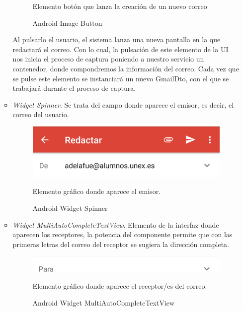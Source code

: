 \documentclass[12pt,a4paper,oneside]{book} %
\begin{document}
\begin{itemize}
\begin{itemize}
\begin{figure}[htb]
\begin{center}
	    	\caption{Android Image Button}{Elemento botón que lanza la creación de un nuevo correo}
    		\label{fig:Android Image Button}
		\end{center}
	\end{figure}
\newline
Al pulsarlo el usuario, el sistema lanza una nueva pantalla en la que redactará el correo. Con lo cual, la pulsación de este elemento de la UI nos inicia el proceso de captura poniendo a nuestro servicio un contenedor, donde compondremos la información del correo. 
\newline
\newline
Cada vez que se pulse este elemento se instanciará un nuevo GmailDto, con el que se trabajará durante el proceso de captura. 

\item \textit{Widget Spinner}. Se trata del campo donde aparece el emisor, es decir, el correo del usuario. 
 	\begin{figure}[H]
		\begin{center}
     		\includegraphics[scale=0.2]{pictures/IRL/GMail/nuevo_correo_gmail_emisor.png}
	    	\caption{Android Widget Spinner}{Elemento gráfico donde aparece el emisor.}
    		\label{fig:Android Widget Spinner}
		\end{center}
	\end{figure}

\item \textit{Widget MultiAutoCompleteTextView}. Elemento de la interfaz donde aparecen los receptores, la potencia del componente permite que con las primeras letras del correo del receptor se sugiera la dirección completa.
 	\begin{figure}[H]
		\begin{center}
     		\includegraphics[scale=0.2]{pictures/IRL/GMail/nuevo_correo_gmail_receptor.png}
	    	\caption{Android Widget MultiAutoCompleteTextView}{Elemento gráfico donde aparece el receptor/es del correo.}
    		\label{fig:Android Widget MultiAutoCompleteTextView}
		\end{center}
	\end{figure}


\end{itemize}
\end{itemize}
\end{document}
